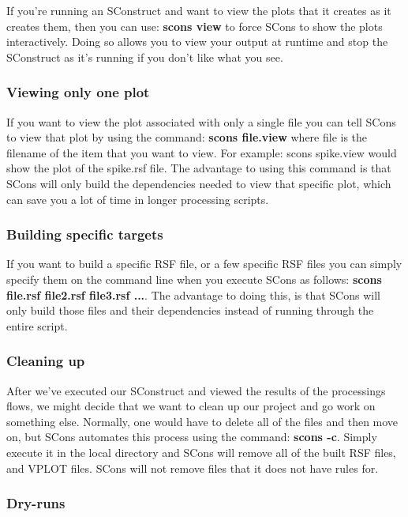 If you're running an SConstruct and want to view the plots that it creates as it creates them, then you can use: \textbf{scons view} to force SCons to show the plots interactively.  Doing so allows you to view your output at runtime and stop the SConstruct as it's running if you don't like what you see.

\subsubsection{Viewing only one plot}

If you want to view the plot associated with only a single file you can tell SCons to view that plot by using the command: \textbf{scons file.view} where file is the filename of the item that you want to view.  For example: scons spike.view would show the plot of the spike.rsf file.  The advantage to using this command is that SCons will only build the dependencies needed to view that specific plot, which can save you a lot of time in longer processing scripts.

\subsubsection{Building specific targets}

If you want to build a specific RSF file, or a few specific RSF files you can simply specify them on the command line when you execute SCons as follows: \textbf{scons file.rsf file2.rsf file3.rsf ...}.  The advantage to doing this, is that SCons will only build those files and their dependencies instead of running through the entire script.

\subsubsection{Cleaning up}

After we've executed our SConstruct and viewed the results of the processings flows, we might decide that we want to clean up our project and go work on something else.  Normally, one would have to delete all of the files and then move on, but SCons automates this process using the command: \textbf{scons -c}.  Simply execute it in the local directory and SCons will remove all of the built RSF files, and VPLOT files.  SCons will not remove files that it does not have rules for.

\subsubsection{Dry-runs}

